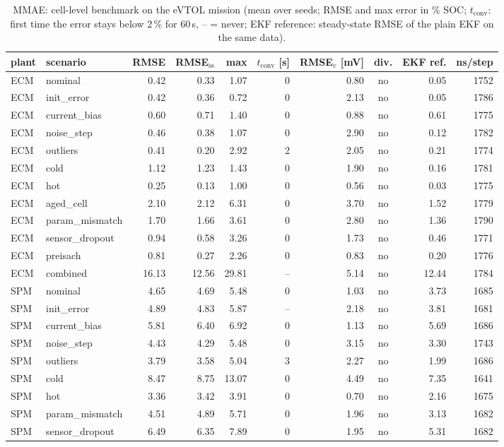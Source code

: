 \begin{table}[H]\centering\footnotesize\setlength{\tabcolsep}{4pt}
\caption{MMAE: cell-level benchmark on the eVTOL mission (mean over seeds; RMSE and max error in \% SOC; $t_\mathrm{conv}$: first time the error stays below 2\,\% for 60\,s, -- = never; EKF reference: steady-state RMSE of the plain EKF on the same data).}\label{tab:cell_MMAE}
\begin{tabular}{llrrrrrcrr}\toprule
plant & scenario & RMSE & RMSE$_\mathrm{ss}$ & max & $t_\mathrm{conv}$ [s] & RMSE$_v$ [mV] & div. & EKF ref. & ns/step \\ \midrule
ECM & nominal & 0.42 & 0.33 & 1.07 & 0 & 0.80 & no & 0.05 & 1752 \\
ECM & init\_error & 0.42 & 0.36 & 0.72 & 0 & 2.13 & no & 0.05 & 1786 \\
ECM & current\_bias & 0.60 & 0.71 & 1.40 & 0 & 0.88 & no & 0.61 & 1775 \\
ECM & noise\_step & 0.46 & 0.38 & 1.07 & 0 & 2.90 & no & 0.12 & 1782 \\
ECM & outliers & 0.41 & 0.20 & 2.92 & 2 & 2.05 & no & 0.21 & 1774 \\
ECM & cold & 1.12 & 1.23 & 1.43 & 0 & 1.90 & no & 0.16 & 1781 \\
ECM & hot & 0.25 & 0.13 & 1.00 & 0 & 0.56 & no & 0.03 & 1775 \\
ECM & aged\_cell & 2.10 & 2.12 & 6.31 & 0 & 3.70 & no & 1.52 & 1779 \\
ECM & param\_mismatch & 1.70 & 1.66 & 3.61 & 0 & 2.80 & no & 1.36 & 1790 \\
ECM & sensor\_dropout & 0.94 & 0.58 & 3.26 & 0 & 1.73 & no & 0.46 & 1771 \\
ECM & preisach & 0.81 & 0.27 & 2.26 & 0 & 0.83 & no & 0.20 & 1776 \\
ECM & combined & 16.13 & 12.56 & 29.81 & -- & 5.14 & no & 12.44 & 1784 \\
\midrule
SPM & nominal & 4.65 & 4.69 & 5.48 & 0 & 1.03 & no & 3.73 & 1685 \\
SPM & init\_error & 4.89 & 4.83 & 5.87 & -- & 2.18 & no & 3.81 & 1681 \\
SPM & current\_bias & 5.81 & 6.40 & 6.92 & 0 & 1.13 & no & 5.69 & 1686 \\
SPM & noise\_step & 4.43 & 4.29 & 5.48 & 0 & 3.15 & no & 3.30 & 1743 \\
SPM & outliers & 3.79 & 3.58 & 5.04 & 3 & 2.27 & no & 1.99 & 1686 \\
SPM & cold & 8.47 & 8.75 & 13.07 & 0 & 4.49 & no & 7.35 & 1641 \\
SPM & hot & 3.36 & 3.42 & 3.91 & 0 & 0.70 & no & 2.16 & 1675 \\
SPM & param\_mismatch & 4.51 & 4.89 & 5.71 & 0 & 1.96 & no & 3.13 & 1682 \\
SPM & sensor\_dropout & 6.49 & 6.35 & 7.89 & 0 & 1.95 & no & 5.31 & 1682 \\
\bottomrule\end{tabular}\end{table}
